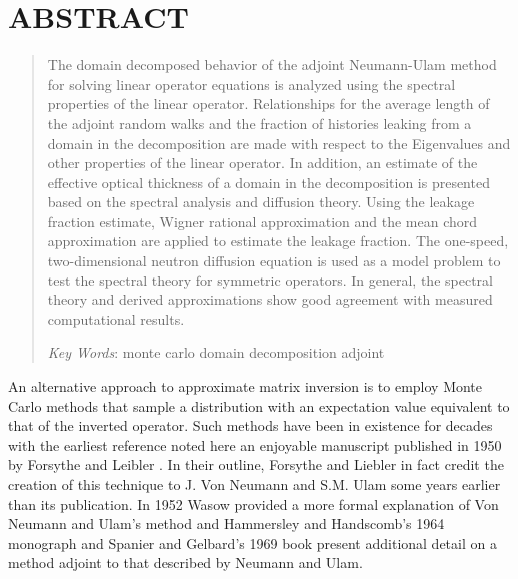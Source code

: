 \documentclass{mc2013}
\begin{document}
\section*{ABSTRACT} 
\begin{quote}
\begin{small}
The domain decomposed behavior of the adjoint Neumann-Ulam method for
solving linear operator equations is analyzed using the spectral
properties of the linear operator. Relationships for the average
length of the adjoint random walks and the fraction of histories
leaking from a domain in the decomposition are made with respect to
the Eigenvalues and other properties of the linear operator. In
addition, an estimate of the effective optical thickness of a domain
in the decomposition is presented based on the spectral analysis and
diffusion theory. Using the leakage fraction estimate, Wigner rational
approximation and the mean chord approximation are applied to estimate
the leakage fraction. The one-speed, two-dimensional neutron diffusion
equation is used as a model problem to test the spectral theory for
symmetric operators. In general, the spectral theory and derived
approximations show good agreement with measured computational
results.

\emph{Key Words}: monte carlo domain decomposition adjoint
\end{small} 
\end{quote}

\setlength{\baselineskip}{14pt}
\normalsize

\label{sec:intro}

An alternative approach to approximate matrix inversion is to employ
Monte Carlo methods that sample a distribution with an expectation
value equivalent to that of the inverted operator. Such methods have
been in existence for decades with the earliest reference noted here
an enjoyable manuscript published in 1950 by Forsythe and Leibler
\cite{forsythe_matrix_1950}. In their outline, Forsythe and Liebler
in fact credit the creation of this technique to J. Von Neumann and
S.M. Ulam some years earlier than its publication. In 1952 Wasow
provided a more formal explanation of Von Neumann and Ulam's method
\cite{wasow_note_1952} and Hammersley and Handscomb's 1964 monograph
\cite{hammersley_monte_1964} and Spanier and Gelbard's 1969 book
\cite{spanier_monte_1969} present additional detail on a method
adjoint to that described by Neumann and Ulam.
\end{document}
